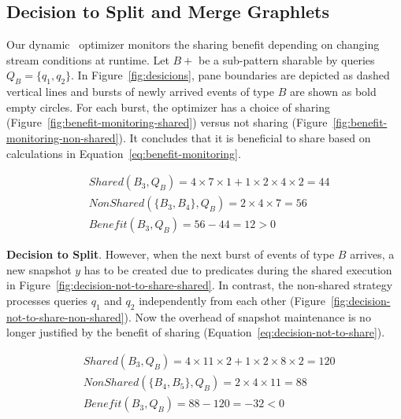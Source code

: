 

\subsection{Decision to Split and Merge Graphlets}
\label{sec:decisions}

Our dynamic \app\ optimizer monitors the sharing benefit depending on changing stream conditions at runtime.
Let $B+$ be a sub-pattern sharable by queries $Q_B = \{q_1,q_2\}$.
In Figure~\ref{fig:desicions}, 
pane boundaries are depicted as dashed vertical lines
and bursts of newly arrived events of type $B$ are shown as bold empty circles. For each burst, the optimizer has a choice of sharing (Figure~\ref{fig:benefit-monitoring-shared}) versus not sharing (Figure~\ref{fig:benefit-monitoring-non-shared}). It concludes that it is beneficial to share based on calculations in Equation~\ref{eq:benefit-monitoring}.
 
\vspace{-4mm}
\begin{align}
&\mathit{Shared}(B_3,Q_B) 
= 4 \times 7 \times 1 
+ 1 \times 2 \times 4 \times 2
= 44
\nonumber\\
&\mathit{NonShared}(\{B_3,B_4\},Q_B) 
= 2 \times 4 \times 7 = 56
\nonumber\\
&\mathit{Benefit}(B_3,Q_B)
= 56 - 44  = 12 > 0
\label{eq:benefit-monitoring}
\end{align}

\textbf{Decision to Split}.
%
However, when the next burst of events of type $B$ arrives, a new snapshot $y$ has to be created due to predicates during the shared execution in Figure~\ref{fig:decision-not-to-share-shared}. 
In contrast, the non-shared strategy processes queries $q_1$ and $q_2$ independently from each other (Figure~\ref{fig:decision-not-to-share-non-shared}). 
Now the overhead of snapshot maintenance is no longer justified by the benefit of sharing (Equation~\ref{eq:decision-not-to-share}).

\vspace{-4mm}
\begin{align}
&\mathit{Shared}(B_3,Q_B) 
= 4 \times 11 \times 2 
+ 1 \times 2 \times 8 \times 2
= 120
\nonumber\\
&\mathit{NonShared}(\{B_4,B_5\},Q_B) 
= 2 \times 4 \times 11 = 88
\nonumber\\
&\mathit{Benefit}(B_3,Q_B)
= 88 - 120 = -32 < 0
\label{eq:decision-not-to-share}
\end{align}

